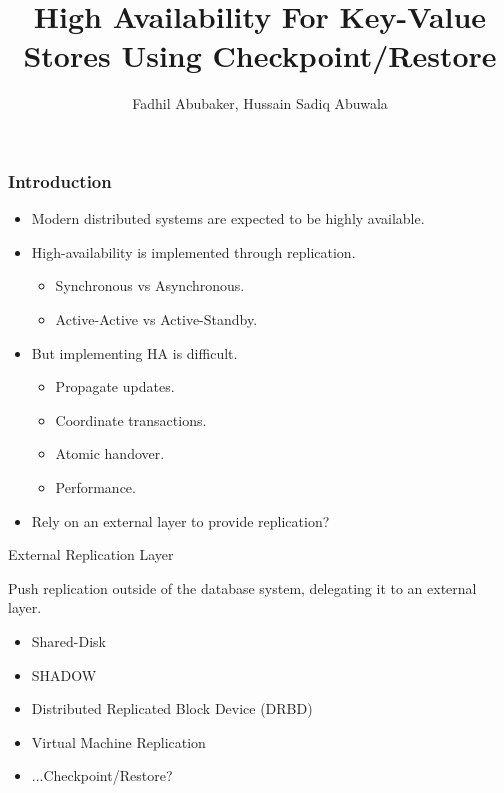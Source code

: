 \documentclass{beamer}
\title{High Availability For Key-Value Stores Using Checkpoint/Restore}
\author{Fadhil Abubaker, Hussain Sadiq Abuwala}
\date{}
\begin{document}
\frame{\titlepage}

\begin{frame}
  \frametitle{Introduction}

  \begin{itemize}
    \item Modern distributed systems are expected to be highly available. \pause
  \end{itemize}

  \begin{itemize}
    \item High-availability is implemented through replication.
    \begin{itemize}
      \item Synchronous vs Asynchronous.
      \item Active-Active vs Active-Standby. \pause
    \end{itemize}
  \end{itemize}

  \begin{itemize}
    \item But implementing HA is difficult.
    \begin{itemize}
      \item Propagate updates.
      \item Coordinate transactions.
      \item Atomic handover.
      \item Performance. \pause
    \end{itemize}
  \end{itemize}

  \begin{itemize}
    \item Rely on an external layer to provide replication?
  \end{itemize}
\end{frame}

\begin{frame}{External Replication Layer}

  Push replication outside of the database system, delegating it to an external
  layer.

  \begin{itemize}
    \pause \item Shared-Disk
    \pause \item SHADOW\footnotemark
    \pause \item Distributed Replicated Block Device (DRBD)
    \pause \item Virtual Machine Replication
    \pause \item ...Checkpoint/Restore?
  \end{itemize}

\end{frame}
\end{document}

